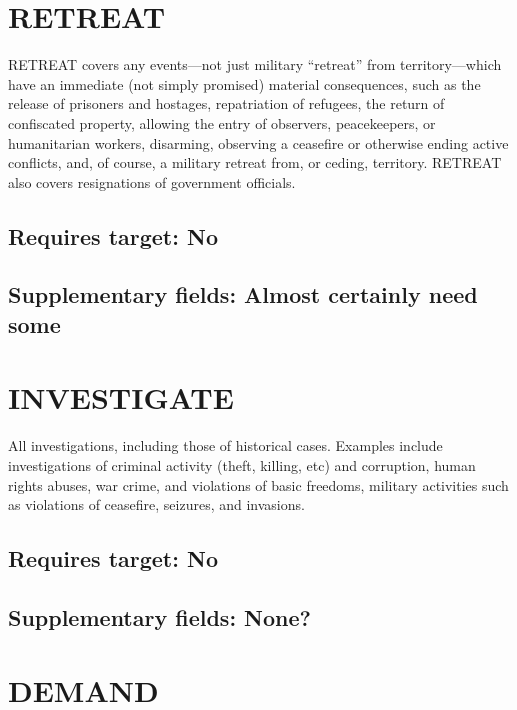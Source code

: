 \documentclass[11pt]{report}
\newcommand{\plcat}[1]{\textsf{#1}}
\begin{document}
\section{RETREAT}

\plcat{RETREAT} covers any events---not just military ``retreat'' from territory---which have an immediate (not simply promised) material consequences, such as the release of prisoners and hostages, repatriation of refugees, the return of  confiscated property, allowing the entry of observers, peacekeepers, or humanitarian workers, disarming, observing a ceasefire or otherwise ending active conflicts, and, of course, a military retreat from, or ceding, territory. \plcat{RETREAT} also covers resignations of government officials.

\subsection{Requires target: No}

\subsection{Supplementary fields: Almost certainly need some}


\bigskip  


\section{INVESTIGATE}

All investigations, including those of historical cases. Examples include investigations of  criminal activity (theft, killing, etc) and corruption, human rights abuses, war crime, and violations of basic freedoms, military activities such as violations of ceasefire, seizures, and invasions.

\subsection{Requires target: No}

\subsection{Supplementary fields: None?}

\newpage  

\section{DEMAND}
\end{document}
